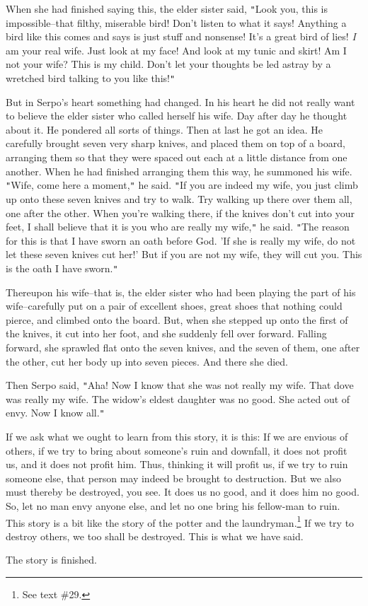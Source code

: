 When she had finished saying this, the elder sister said, \texttt{"}Look you, this
is impossible--that filthy, miserable bird! Don't listen to what it says! Anything
a bird like this comes and says is just stuff and nonsense! It's a great bird of
lies! \textit{I} am your real wife. Just look at my face! And look at my tunic
and skirt! Am I not your wife? This is my child. Don't let your thoughts be led
astray by a wretched bird talking to you like this!\texttt{"}

But in Serpo's heart something had changed. In his heart he did not really want
to believe the elder sister who called herself his wife. Day after day he thought
about it. He pondered all sorts of things. Then at last he got an idea. He carefully
brought seven very sharp knives, and placed them on top of a board, arranging them
so that they were spaced out each at a little distance from one another. When he
had finished arranging them this way, he summoned his wife. \texttt{"}Wife, come
here a moment,\texttt{"} he said. \texttt{"}If you are indeed my wife, you just
climb up onto these seven knives and try to walk. Try walking up there over them
all, one after the other. When you're walking there, if the knives don't cut into
your feet, I shall believe that it is you who are really my wife,\texttt{"} he
said. \texttt{"}The reason for this is that I have sworn an oath before God. 'If
she is really my wife, do not let these seven knives cut her!' But if you are not
my wife, they will cut you. This is the oath I have sworn.\texttt{"}

Thereupon his wife--that is, the elder sister who had been playing the part of
his wife--carefully put on a pair of excellent shoes, great shoes that nothing
could pierce, and climbed onto the board. But, when she stepped up onto the first
of the knives, it cut into her foot, and she suddenly fell over forward. Falling
forward, she sprawled flat onto the seven knives, and the seven of them, one after
the other, cut her body up into seven pieces. And there she died.

Then Serpo said, \texttt{"}Aha! Now I know that she was not really my wife. That
dove was really my wife. The widow's eldest daughter was no good. She acted out
of envy. Now I know all.\texttt{"}

If we ask what we ought to learn from this story, it is this: If we are envious
of others, if we try to bring about someone's ruin and downfall, it does not profit
us, and it does not profit him. Thus, thinking it will profit us, if we try to
ruin someone else, that person may indeed be brought to destruction. But we also
must thereby be destroyed, you see. It does us no good, and it does him no good.
So, let no man envy anyone else, and let no one bring his fellow-man to ruin. This
story is a bit like the story of the potter and the laundryman.\footnote{See text \#29.} If we try to
destroy others, we too shall be destroyed. This is what we have said.

The story is finished.


